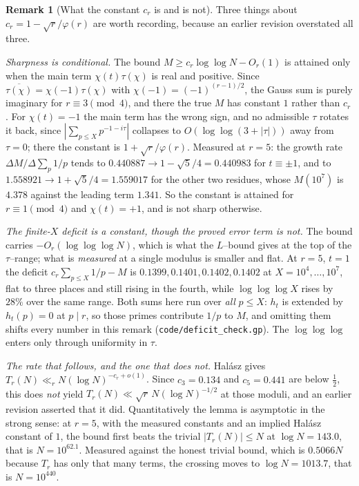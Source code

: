 \documentclass[11pt]{article}
\theoremstyle{definition}
\newtheorem{remark}[theorem]{Remark}
\begin{document}
\begin{remark}[What the constant $c_r$ is and is not]\label{rem:charcancelsharp}
Three things about $c_r=1-\sqrt r/\varphi(r)$ are worth recording, because an earlier revision
overstated all three.

\emph{Sharpness is conditional.} The bound $M\ge c_r\log\log N-O_r(1)$ is attained only when the
main term $\chi(t)\tau(\chi)$ is real and positive. Since $\overline{\tau(\chi)}=\chi(-1)\tau(\chi)$
with $\chi(-1)=(-1)^{(r-1)/2}$, the Gauss sum is purely imaginary for $r\equiv3\pmod4$, and there
the true $M$ has constant $1$ rather than $c_r$. For $\chi(t)=-1$ the main term has the wrong sign, and no
admissible $\tau$ rotates it back, since $|\sum_{p\le X}p^{-1-i\tau}|$ collapses to
$O(\log\log(3+|\tau|))$ away from $\tau=0$; there the constant is $1+\sqrt r/\varphi(r)$. Measured
at $r=5$: the growth rate $\Delta M/\Delta\sum_p1/p$ tends to $0.440887\to1-\sqrt5/4=0.440983$ for
$t\equiv\pm1$, and to $1.558921\to1+\sqrt5/4=1.559017$ for the other two residues, whose $M(10^7)$
is $4.378$ against the leading term $1.341$. So the constant is attained for
$r\equiv1\pmod4$ and $\chi(t)=+1$, and is not sharp otherwise.

\emph{The finite-$X$ deficit is a constant, though the proved error term is not.} The bound carries
$-O_r(\log\log\log N)$, which is what the $L$--bound gives at the top of the $\tau$--range; what is
\emph{measured} at a single modulus is smaller and flat. At $r=5$, $t=1$ the deficit
$c_r\sum_{p\le X}1/p-M$ is $0.1399,0.1401,0.1402,0.1402$ at $X=10^4,\dots,10^7$, flat to three
places and still rising in the fourth, while $\log\log\log X$ rises by $28\%$ over the same range.
Both sums here run over \emph{all} $p\le X$: $h_t$ is extended by $h_t(p)=0$ at $p\mid r$, so those
primes contribute $1/p$ to $M$, and omitting them shifts every number in this remark
\textup{(\texttt{code/deficit\_check.gp})}. The $\log\log\log$ enters only
through uniformity in $\tau$.

\emph{The rate that follows, and the one that does not.} Hal\'asz gives
$T_r(N)\ll_rN(\log N)^{-c_r+o(1)}$. Since $c_3=0.134$ and $c_5=0.441$ are below $\tfrac12$, this
does \emph{not} yield $T_r(N)\ll\sqrt r\,N(\log N)^{-1/2}$ at those moduli, and an earlier revision
asserted that it did. Quantitatively the lemma is asymptotic in the strong sense: at $r=5$, with the
measured constants and an implied Hal\'asz constant of $1$, the bound first beats the trivial
$|T_r(N)|\le N$ at $\log N=143.0$, that is $N=10^{62.1}$. Measured against the honest trivial bound,
which is $0.5066N$ because $T_r$ has only that many terms, the crossing moves to $\log N=1013.7$,
that is $N=10^{440}$.
\end{remark}
\end{document}
